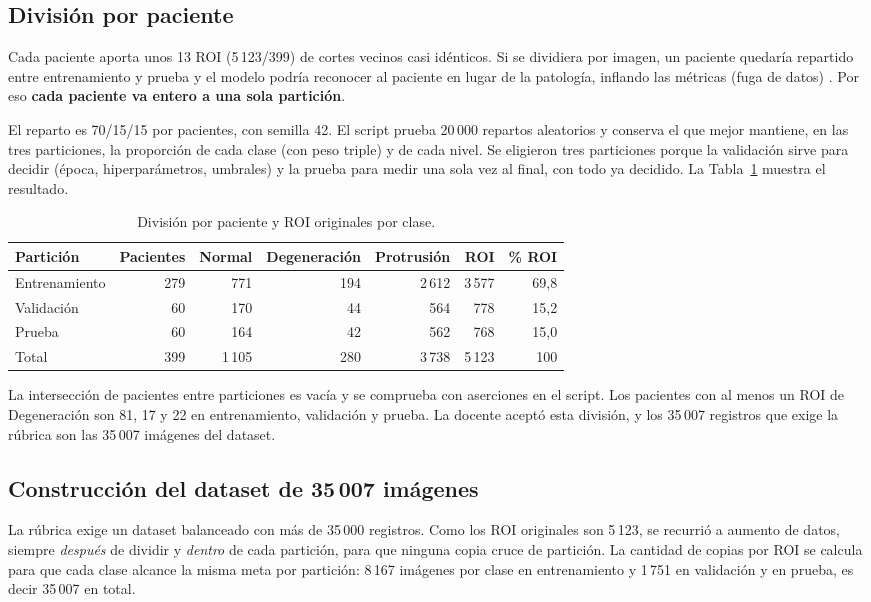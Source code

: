 \subsection{División por paciente}
\label{sec:split}
Cada paciente aporta unos 13 ROI (5\,123/399) de cortes vecinos casi idénticos. Si se dividiera por imagen, un paciente quedaría repartido entre entrenamiento y prueba y el modelo podría reconocer al paciente en lugar de la patología, inflando las métricas (fuga de datos) \cite{brunekreef2024,rumala2023}. Por eso \textbf{cada paciente va entero a una sola partición}.

El reparto es 70/15/15 por pacientes, con semilla 42. El script prueba 20\,000 repartos aleatorios y conserva el que mejor mantiene, en las tres particiones, la proporción de cada clase (con peso triple) y de cada nivel. Se eligieron tres particiones porque la validación sirve para decidir (época, hiperparámetros, umbrales) y la prueba para medir una sola vez al final, con todo ya decidido. La Tabla~\ref{tab:split} muestra el resultado.

\begin{table}[t]
\centering\small
\caption{División por paciente y ROI originales por clase.}
\label{tab:split}
\begin{tabular}{lrrrrrr}
\toprule
Partición & Pacientes & Normal & Degeneración & Protrusión & ROI & \% ROI \\
\midrule
Entrenamiento & 279 & 771   & 194 & 2\,612 & 3\,577 & 69,8 \\
Validación    & 60  & 170   & 44  & 564    & 778    & 15,2 \\
Prueba        & 60  & 164   & 42  & 562    & 768    & 15,0 \\
\midrule
Total         & 399 & 1\,105 & 280 & 3\,738 & 5\,123 & 100 \\
\bottomrule
\end{tabular}
\end{table}

La intersección de pacientes entre particiones es vacía y se comprueba con aserciones en el script. Los pacientes con al menos un ROI de Degeneración son 81, 17 y 22 en entrenamiento, validación y prueba. La docente aceptó esta división, y los 35\,007 registros que exige la rúbrica son las 35\,007 imágenes del dataset.

\subsection{Construcción del dataset de 35\,007 imágenes}
\label{sec:aumento}
La rúbrica exige un dataset balanceado con más de 35\,000 registros. Como los ROI originales son 5\,123, se recurrió a aumento de datos, siempre \emph{después} de dividir y \emph{dentro} de cada partición, para que ninguna copia cruce de partición. La cantidad de copias por ROI se calcula para que cada clase alcance la misma meta por partición: 8\,167 imágenes por clase en entrenamiento y 1\,751 en validación y en prueba, es decir 35\,007 en total.


